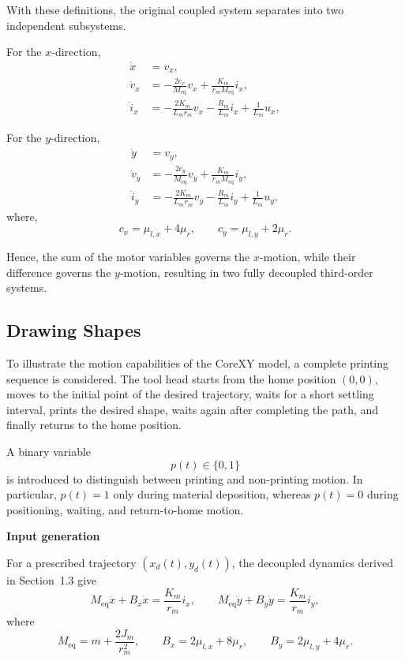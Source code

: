 \documentclass[11pt,a4paper]{article}
\begin{document}
With these definitions, the original coupled system separates into two
independent subsystems.

For the $x$-direction,
\begin{equation}
\begin{aligned}
\dot{x} &= v_x,\\
\dot{v}_x &=
-\frac{2c_x}{M_{\mathrm{eq}}}v_x
+
\frac{K_m}{r_mM_{\mathrm{eq}}}i_x,\\
\dot{i}_x &=
-\frac{2K_m}{L_mr_m}v_x
-\frac{R_m}{L_m}i_x
+\frac{1}{L_m}u_x,
\end{aligned}
\end{equation}


For the $y$-direction,
\begin{equation}
\begin{aligned}
\dot{y} &= v_y,\\
\dot{v}_y &=
-\frac{2c_y}{M_{\mathrm{eq}}}v_y
+
\frac{K_m}{r_mM_{\mathrm{eq}}}i_y,\\
\dot{i}_y &=
-\frac{2K_m}{L_mr_m}v_y
-\frac{R_m}{L_m}i_y
+\frac{1}{L_m}u_y,
\end{aligned}
\end{equation}
where,
\begin{equation}
c_x=\mu_{l,x}+4\mu_r,
\qquad
c_y=\mu_{l,y}+2\mu_r.
\end{equation}

Hence, the sum of the motor variables governs the $x$-motion, while their
difference governs the $y$-motion, resulting in two fully decoupled
third-order systems.
\subsection{Drawing Shapes}

To illustrate the motion capabilities of the CoreXY model, a complete
printing sequence is considered. The tool head starts from the home
position $(0,0)$, moves to the initial point of the desired trajectory,
waits for a short settling interval, prints the desired shape, waits
again after completing the path, and finally returns to the home
position.

A binary variable
\[
p(t)\in\{0,1\}
\]
is introduced to distinguish between printing and non-printing motion.
In particular, $p(t)=1$ only during material deposition, whereas
$p(t)=0$ during positioning, waiting, and return-to-home motion.

\medskip
\noindent\textbf{Input generation}

For a prescribed trajectory $(x_d(t),y_d(t))$, the decoupled dynamics
derived in Section~1.3 give
\[
M_{\mathrm{eq}}\ddot{x}+B_x\dot{x}
=
\frac{K_m}{r_m}i_x,
\qquad
M_{\mathrm{eq}}\ddot{y}+B_y\dot{y}
=
\frac{K_m}{r_m}i_y,
\]
where
\[
M_{\mathrm{eq}}=m+\frac{2J_m}{r_m^2},
\qquad
B_x=2\mu_{l,x}+8\mu_r,
\qquad
B_y=2\mu_{l,y}+4\mu_r.
\]
\end{document}
